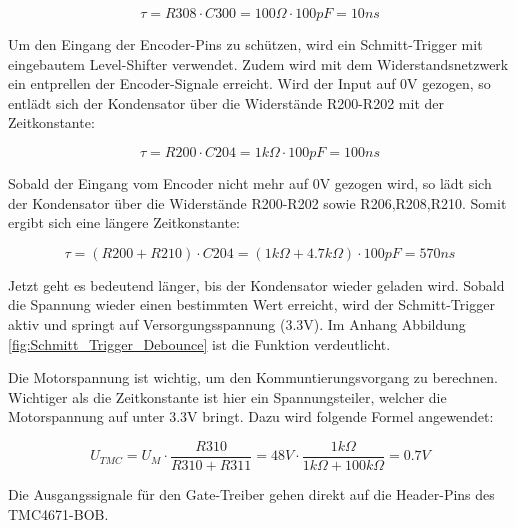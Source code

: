 \begin{equation}
\tau = R308 \cdot C300 = 100\Omega \cdot 100pF = 10ns
\end{equation}


Um den Eingang der Encoder-Pins zu schützen, wird ein Schmitt-Trigger mit eingebautem Level-Shifter verwendet. Zudem wird mit dem Widerstandsnetzwerk ein entprellen der Encoder-Signale erreicht. Wird der Input auf 0V gezogen, so entlädt sich der Kondensator über die Widerstände R200-R202 mit der Zeitkonstante:

\begin{equation}
\tau = R200 \cdot C204 = 1k\Omega \cdot 100pF = 100ns
\end{equation}

Sobald der Eingang vom Encoder nicht mehr auf 0V gezogen wird, so lädt sich der Kondensator über die Widerstände R200-R202 sowie R206,R208,R210. Somit ergibt sich eine längere Zeitkonstante:

\begin{equation}
\tau = (R200 + R210) \cdot C204 = (1k\Omega + 4.7k\Omega) \cdot 100pF = 570ns
\end{equation}

Jetzt geht es bedeutend länger, bis der Kondensator wieder geladen wird. Sobald die Spannung wieder einen bestimmten Wert erreicht, wird der Schmitt-Trigger aktiv und springt auf Versorgungsspannung (3.3V). Im Anhang Abbildung \ref{fig:Schmitt_Trigger_Debounce} ist die Funktion verdeutlicht.


Die Motorspannung ist wichtig, um den Kommuntierungsvorgang zu berechnen. Wichtiger als die Zeitkonstante ist hier ein Spannungsteiler, welcher die Motorspannung auf unter 3.3V bringt. Dazu wird folgende Formel angewendet:

\begin{equation}
U_{TMC} = U_M \cdot \frac{R310}{R310 + R311} = 48V \cdot \frac{1k\Omega}{1k\Omega + 100k\Omega} = 0.7V
\end{equation}


Die Ausgangssignale für den Gate-Treiber gehen direkt auf die Header-Pins des TMC4671-BOB.

